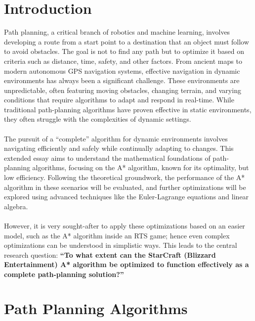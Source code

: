 \documentclass[12pt]{article}
\begin{document}
\section{Introduction}
Path planning, a critical branch of robotics and machine learning, involves developing a route from a start point to a destination that an object must follow to avoid obstacles. The goal is not to find any path but to optimize it based on criteria such as distance, time, safety, and other factors. From ancient maps to modern autonomous GPS navigation systems, effective navigation in dynamic environments has always been a significant challenge. These environments are unpredictable, often featuring moving obstacles, changing terrain, and varying conditions that require algorithms to adapt and respond in real-time. While traditional path-planning algorithms have proven effective in static environments, they often struggle with the complexities of dynamic settings.
\\\\
The pursuit of a “complete” algorithm for dynamic environments involves navigating efficiently and safely while continually adapting to changes. This extended essay aims to understand the mathematical foundations of path-planning algorithms, focusing on the A* algorithm, known for its optimality, but low efficiency. Following the theoretical groundwork, the performance of the A* algorithm in these scenarios will be evaluated, and further optimizations will be explored using advanced techniques like the Euler-Lagrange equations and linear algebra.
\\\\
However, it is very sought-after to apply these optimizations based on an easier model, such as the A* algorithm inside an RTS game; hence even complex optimizations can be understood in simplistic ways. This leads to the central research question: \textbf{“To what extent can the StarCraft (Blizzard Entertainment) A* algorithm be optimized to function effectively as a complete path-planning solution?”}


\newpage
\section{Path Planning Algorithms}
\end{document}
